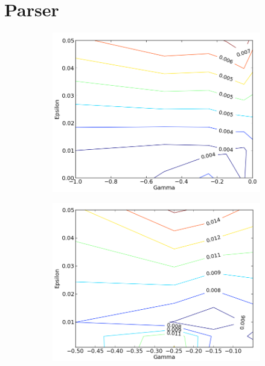 \documentclass[12pt,notitlepage,twoside]{scrreprt}
\begin{document}
\section{Parser}

\begin{figure}[h!]
\centering
\begin{subfigure}[b]{.49\textwidth}
  \centering
  \includegraphics[width=\linewidth]{figs/fine_tune_tr_zoom.png}
  \caption{}
  \label{coarse}
\end{subfigure}
\begin{subfigure}[b]{.49\textwidth}
  \centering
  \includegraphics[width=\linewidth]{figs/fine_tune_ts.png}
  \caption{}
  \label{fine}
\end{subfigure}
\end{figure}
\end{document}
